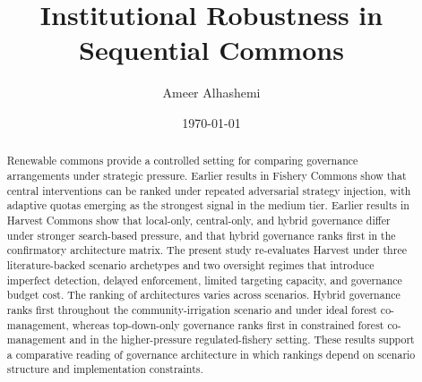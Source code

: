 \documentclass[11pt]{article}
\title{Institutional Robustness in Sequential Commons}
\author{Ameer Alhashemi}
\date{\today}
\begin{document}
\maketitle

\begin{abstract}
Renewable commons provide a controlled setting for comparing governance arrangements under strategic pressure. Earlier results in Fishery Commons show that central interventions can be ranked under repeated adversarial strategy injection, with adaptive quotas emerging as the strongest signal in the medium tier. Earlier results in Harvest Commons show that local-only, central-only, and hybrid governance differ under stronger search-based pressure, and that hybrid governance ranks first in the confirmatory architecture matrix. The present study re-evaluates Harvest under three literature-backed scenario archetypes and two oversight regimes that introduce imperfect detection, delayed enforcement, limited targeting capacity, and governance budget cost. The ranking of architectures varies across scenarios. Hybrid governance ranks first throughout the community-irrigation scenario and under ideal forest co-management, whereas top-down-only governance ranks first in constrained forest co-management and in the higher-pressure regulated-fishery setting. These results support a comparative reading of governance architecture in which rankings depend on scenario structure and implementation constraints.
\end{abstract}






\clearpage


\end{document}
